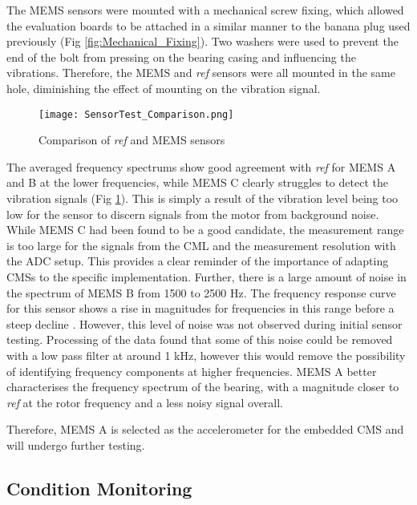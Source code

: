 The MEMS sensors were mounted with a mechanical screw fixing, which allowed the evaluation boards to be attached in a similar manner to the banana plug used previously (Fig \ref{fig:Mechanical_Fixing}).
Two washers were used to prevent the end of the bolt from pressing on the bearing casing and influencing the vibrations.
Therefore, the MEMS and \textit{ref} sensors were all mounted in the same hole, diminishing the effect of mounting on the vibration signal.
\par

\begin{figure}
    \centering
    \texttt{[image: SensorTest\_Comparison.png]}
    \caption{Comparison of \textit{ref} and MEMS sensors}
    \label{fig:SensorTest_Comparison}
\end{figure}

The averaged frequency spectrums show good agreement with \textit{ref} for MEMS A and B at the lower frequencies, while MEMS C clearly struggles to detect the vibration signals (Fig \ref{fig:SensorTest_Comparison}).
This is simply a result of the vibration level being too low for the sensor to discern signals from the motor from background noise.
While MEMS C had been found to be a good candidate, the measurement range is too large for the signals from the CML and the measurement resolution with the ADC setup.
This provides a clear reminder of the importance of adapting CMSs to the specific implementation.
Further, there is a large amount of noise in the spectrum of MEMS B from 1500 to 2500 Hz.
The frequency response curve for this sensor shows a rise in magnitudes for frequencies in this range before a steep decline \cite{ADXL354}.
However, this level of noise was not observed during initial sensor testing.
Processing of the data found that some of this noise could be removed with a low pass filter at around 1 kHz, however this would remove the possibility of identifying frequency components at higher frequencies.
MEMS A better characterises the frequency spectrum of the bearing, with a magnitude closer to \textit{ref} at the rotor frequency and a less noisy signal overall.
\par

Therefore, MEMS A is selected as the accelerometer for the embedded CMS and will undergo further testing.


\subsection{Condition Monitoring}

